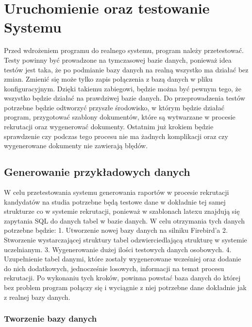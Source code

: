 \chapter{Uruchomienie oraz testowanie Systemu}

Przed wdrożeniem programu do realnego systemu, program należy przetestować. Testy powinny być prowadzone na tymczasowej bazie danych, ponieważ idea testów jest taka, że po podmianie bazy danych na realną wszystko ma działać bez zmian. Zmienić się może tylko zapis połączenia z bazą danych w pliku konfiguracyjnym. Dzięki takiemu zabiegowi, będzie można być pewnym tego, że wszystko będzie działać na prawdziwej bazie danych.  Do przeprowadzenia testów potrzebne będzie  odtworzyć przyszłe środowisko, w którym będzie działać program, przygotować szablony dokumentów, które są wytwarzane w procesie rekrutacji oraz wygenerować dokumenty. Ostatnim już krokiem będzie sprawdzenie czy podczas tego procesu nie ma żadnych komplikacji oraz czy wygenerowane dokumenty nie zawierają błędów.

\section{ Generowanie przykładowych danych}

W celu przetestowania systemu generowania raportów w procesie rekrutacji kandydatów na studia potrzebne będą testowe dane w dokładnie tej samej strukturze co w systemie rekrutacji, ponieważ w szablonach latexu znajdują się zapytania SQL do danych tabel w bazie danych. 
W celu otrzymania tych danych potrzebne będzie:
1.	Utworzenie nowej bazy danych na silniku Firebird’a 
2.	Stworzenie wystarczającej struktury tabel odzwierciedlającą strukturę w systemie uczelnianym.
3.	Wygenerowanie dużej ilości testowych danych osobowych.
4.	Uzupełnienie tabel danymi, które zostały wygenerowane wcześniej oraz dodanie do nich dodatkowych, jednocześnie losowych, informacji na temat procesu rekrutacji.
Po wykonaniu tych kroków, powinna powstać baza danych do której bez problem program połączy się i wyciągnie z niej potrzebne dane dokładnie jak z realnej bazy danych.

\subsection{ Tworzenie bazy danych }

